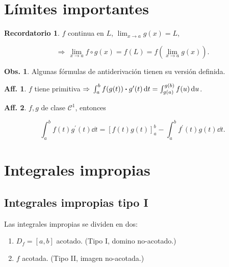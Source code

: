 \documentclass{article}
\theoremstyle{definicion}
\theoremstyle{definition}             %
\theoremstyle{definition}             %
\theoremstyle{definition}
\newtheorem{record}{Recordatorio}
\theoremstyle{definition}
\theoremstyle{observacion}
\newtheorem{obs}{Obs.}
\theoremstyle{definition}
\theoremstyle{plain}
\theoremstyle{definition}
\theoremstyle{afirmacion}
\newtheorem{aff}{Aff.}
\theoremstyle{definition}
\begin{document}
    \section{Límites importantes}

    \begin{record}
        \(f\) continua en \(L\), \(\lim_{x\to a} g(x) = L\),

        \begin{equation*}
            \Rightarrow\, \lim_{x\to a} f \circ g (x) = f(L) = f(\lim_{x\to a}g(x)).
        \end{equation*}
    \end{record}

    \begin{obs}
        Algunas fórmulas de antiderivación tienen su versión definida.
    \end{obs}

    \begin{aff}
        \(f\) tiene primitiva \(\Rightarrow\, \int_{a}^{b}f(g(t))\vdot g^{\prime}(t)\dd{t} = \int_{g(a)}^{g(b)}f(u) \dd{u}\).
    \end{aff}

    \begin{aff}
        \(f,g\) de clase \(\mathscr{C}^{1}\), entonces 

        \begin{equation*}
            \int_{a}^{b}f(t)g^{\prime}(t)\dd{t} = [f(t)g(t)]_{a}^{b} - \int_{a}^{b}f^{\prime}(t)g(t)\dd{t}.
        \end{equation*}
    \end{aff}

    \section{Integrales impropias}

    \subsection{Integrales impropias tipo I}

    Las integrales impropias se dividen en dos:

    \begin{enumerate}
        \item \(D_{f} = [a,b]\) acotado. (Tipo I, domino no-acotado.)
        \item \(f\) acotada. (Tipo II, imagen no-acotada.)
    \end{enumerate}
\end{document}
